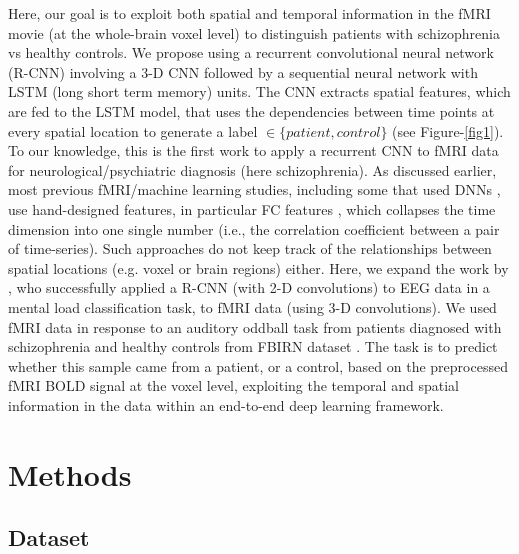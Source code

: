 \documentclass{article}
\begin{document}
Here, our goal is to exploit both spatial and temporal information in the fMRI movie (at the whole-brain voxel level) to distinguish patients with schizophrenia vs healthy controls. We propose using a recurrent convolutional neural network (R-CNN) involving a 3-D CNN followed by a sequential neural network with LSTM (long short term memory) units. The CNN extracts spatial features, which are fed to the LSTM model, that uses the dependencies between time points at every spatial location to generate a label $\in\{patient, control\}$ (see Figure-\ref{fig1}). To our knowledge, this is the first work to apply a recurrent CNN to fMRI data for neurological/psychiatric diagnosis (here schizophrenia). As discussed earlier, most previous fMRI/machine learning studies, including some that used DNNs \citep{Kim2016}, use hand-designed features, in particular FC features \citep{Gheiratmand2017}, which collapses the time dimension into one single number (i.e., the correlation coefficient between a pair of time-series). Such approaches do not keep track of the relationships between spatial locations (e.g. voxel or brain regions) either. Here, we expand the work by \citep{Bashivan2016}, who successfully applied a R-CNN (with 2-D convolutions) to EEG data in a mental load classification task, to fMRI data (using 3-D convolutions). %
We used fMRI data in response to an auditory oddball task from patients diagnosed with schizophrenia and healthy controls from FBIRN dataset \citep{Keator2016}. The task is to predict whether this sample came from a patient, or a control, based on the preprocessed fMRI BOLD signal at the voxel level, exploiting the temporal and spatial information in the data within an end-to-end deep learning framework.

\section{Methods}

\subsection{Dataset}
\end{document}
